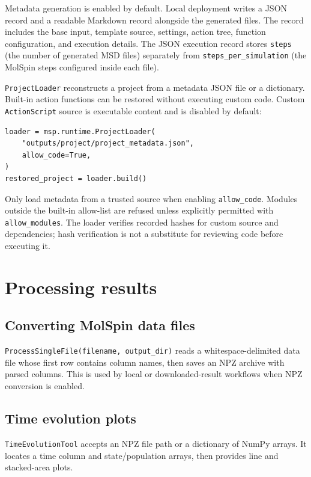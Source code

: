 \documentclass[11pt,a4paper]{article}
\begin{document}
Metadata generation is enabled by default. Local deployment writes a JSON
record and a readable Markdown record alongside the generated files. The
record includes the base input, template source, settings, action tree,
function configuration, and execution details. The JSON execution record
stores \texttt{steps} (the number of generated MSD files) separately from
\texttt{steps\_per\_simulation} (the MolSpin steps configured inside each
file).

\texttt{ProjectLoader} reconstructs a project from a metadata JSON file or a
dictionary. Built-in action functions can be restored without executing
custom code. Custom \texttt{ActionScript} source is executable content and is
disabled by default:

\begin{lstlisting}
loader = msp.runtime.ProjectLoader(
    "outputs/project/project_metadata.json",
    allow_code=True,
)
restored_project = loader.build()
\end{lstlisting}

Only load metadata from a trusted source when enabling \texttt{allow\_code}.
Modules outside the built-in allow-list are refused unless explicitly
permitted with \texttt{allow\_modules}. The loader verifies recorded hashes
for custom source and dependencies; hash verification is not a substitute for
reviewing code before executing it.

\section{Processing results}

\subsection{Converting MolSpin data files}

\texttt{ProcessSingleFile(filename, output\_dir)} reads a whitespace-delimited
data file whose first row contains column names, then saves an NPZ archive
with parsed columns. This is used by local or downloaded-result workflows
when NPZ conversion is enabled.

\subsection{Time evolution plots}

\texttt{TimeEvolutionTool} accepts an NPZ file path or a dictionary of
NumPy arrays. It locates a time column and state/population arrays, then
provides line and stacked-area plots.
\end{document}

